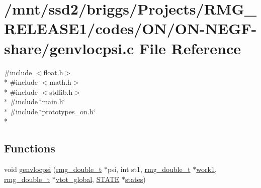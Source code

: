 \hypertarget{_o_n_2_o_n-_n_e_g_f-share_2genvlocpsi_8c}{\section{/mnt/ssd2/briggs/\-Projects/\-R\-M\-G\-\_\-\-R\-E\-L\-E\-A\-S\-E1/codes/\-O\-N/\-O\-N-\/\-N\-E\-G\-F-\/share/genvlocpsi.c File Reference}
\label{_o_n_2_o_n-_n_e_g_f-share_2genvlocpsi_8c}
}
{\ttfamily \#include $<$float.\-h$>$}\\*
{\ttfamily \#include $<$math.\-h$>$}\\*
{\ttfamily \#include $<$stdlib.\-h$>$}\\*
{\ttfamily \#include \char`\"{}main.\-h\char`\"{}}\\*
{\ttfamily \#include \char`\"{}prototypes\-\_\-on.\-h\char`\"{}}\\*
\subsection*{Functions}
\begin{DoxyCompactItemize}
\item 
void \hyperlink{_o_n_2_o_n-_n_e_g_f-share_2genvlocpsi_8c_a26ca349b81df5fdc653dca2417b1e58e}{genvlocpsi} (\hyperlink{rmgtypes_8h_aaa16921c14f121c56eaa42390a340db8}{rmg\-\_\-double\-\_\-t} $\ast$psi, int st1, \hyperlink{rmgtypes_8h_aaa16921c14f121c56eaa42390a340db8}{rmg\-\_\-double\-\_\-t} $\ast$\hyperlink{_t_d_d_f_t_2_common_2mg__eig_8c_afa4d5695ba7e2e1cd04f9e56f0b03cd2}{work1}, \hyperlink{rmgtypes_8h_aaa16921c14f121c56eaa42390a340db8}{rmg\-\_\-double\-\_\-t} $\ast$\hyperlink{md_8h_a920e9d60b9492610c9a8ad1dfdf793f4}{vtot\-\_\-global}, \hyperlink{struct_s_t_a_t_e}{S\-T\-A\-T\-E} $\ast$\hyperlink{md_8h_a286ebf6b996d2b1827eb9a889dfc83d7}{states})
\end{DoxyCompactItemize}


